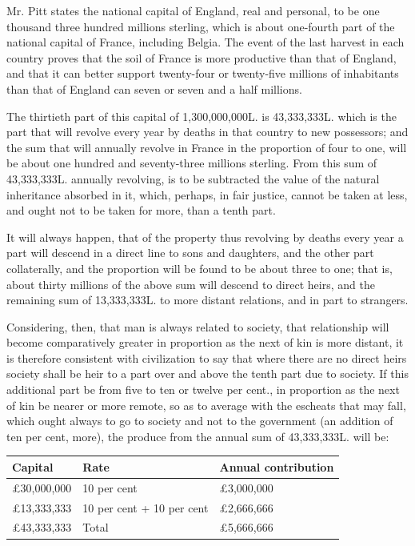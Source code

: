 Mr. Pitt states the national capital of England, real and personal, to be one thousand three hundred millions sterling, which is about one-fourth part of the national capital of France, including Belgia. The event of the last harvest in each country proves that the soil of France is more productive than that of England, and that it can better support twenty-four or twenty-five millions of inhabitants than that of England can seven or seven and a half millions.\par

The thirtieth part of this capital of 1,300,000,000L. is 43,333,333L. which is the part that will revolve every year by deaths in that country to new possessors; and the sum that will annually revolve in France in the proportion of four to one, will be about one hundred and seventy-three millions sterling. From this sum of 43,333,333L. annually revolving, is to be subtracted the value of the natural inheritance absorbed in it, which, perhaps, in fair justice, cannot be taken at less, and ought not to be taken for more, than a tenth part.\par

It will always happen, that of the property thus revolving by deaths every year a part will descend in a direct line to sons and daughters, and the other part collaterally, and the proportion will be found to be about three to one; that is, about thirty millions of the above sum will descend to direct heirs, and the remaining sum of 13,333,333L. to more distant relations, and in part to strangers.\par

Considering, then, that man is always related to society, that relationship will become comparatively greater in proportion as the next of kin is more distant, it is therefore consistent with civilization to say that where there are no direct heirs society shall be heir to a part over and above the tenth part due to society. If this additional part be from five to ten or twelve per cent., in proportion as the next of kin be nearer or more remote, so as to average with the escheats that may fall, which ought always to go to society and not to the government (an addition of ten per cent, more), the produce from the annual sum of 43,333,333L. will be:\par

\begingroup
\setlength{\parindent}{0pt}
\renewcommand{\arraystretch}{1.45}
\setlength{\tabcolsep}{7pt}
\noindent\begin{tabularx}{\textwidth}{@{}p{125pt}p{155pt}X@{}}
\arrayrulecolor{rule}
\rowcolor{headbg}
\textbf{Capital} & \textbf{Rate} & \textbf{Annual contribution} \\
\hline
£30,000,000 & 10 per cent & £3,000,000 \\
£13,333,333 & 10 per cent + 10 per cent & £2,666,666 \\
£43,333,333 & Total & £5,666,666 \\
\hline
\end{tabularx}
\endgroup
\vspace{10pt}


